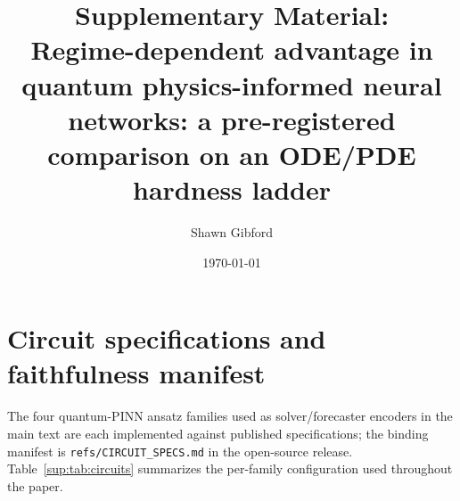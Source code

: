 \documentclass[%
  prx,
  amsmath,
  amssymb,
  aps,
  reprint,
  superscriptaddress,
  floatfix,
]{revtex4-2}
\begin{document}
\title{Supplementary Material:\\
  Regime-dependent advantage in quantum physics-informed neural
  networks: a pre-registered comparison on an ODE/PDE hardness
  ladder}

\author{Shawn Gibford}

\date{\today}

\maketitle

\tableofcontents

\section{Circuit specifications and faithfulness manifest}
\label{sup:circuit-specs}

The four quantum-PINN ansatz families used as solver/forecaster
encoders in the main text are each implemented against published
specifications; the binding manifest is
\texttt{refs/CIRCUIT\_SPECS.md} in the open-source release.
Table~\ref{sup:tab:circuits} summarizes the per-family
configuration used throughout the paper.
\end{document}
